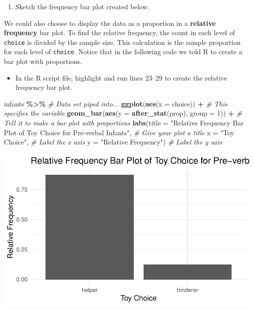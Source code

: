 \documentclass[
]{report}
\newenvironment{Shaded}{\begin{snugshade}}{\end{snugshade}}
\newcommand{\AttributeTok}[1]{\textcolor[rgb]{0.13,0.29,0.53}{#1}}
\newcommand{\CommentTok}[1]{\textcolor[rgb]{0.56,0.35,0.01}{\textit{#1}}}
\newcommand{\DecValTok}[1]{\textcolor[rgb]{0.00,0.00,0.81}{#1}}
\newcommand{\FunctionTok}[1]{\textcolor[rgb]{0.13,0.29,0.53}{\textbf{#1}}}
\newcommand{\NormalTok}[1]{#1}
\newcommand{\SpecialCharTok}[1]{\textcolor[rgb]{0.81,0.36,0.00}{\textbf{#1}}}
\newcommand{\StringTok}[1]{\textcolor[rgb]{0.31,0.60,0.02}{#1}}
\providecommand{\tightlist}{%
  \setlength{\itemsep}{0pt}\setlength{\parskip}{0pt}}
\begin{document}
\begin{enumerate}
\def\labelenumi{\arabic{enumi}.}
\setcounter{enumi}{3}
\tightlist
\item
  Sketch the frequency bar plot created below.
\end{enumerate}

\vspace{1.8in}

We could also choose to display the data as a proportion in a \textbf{relative frequency} bar plot. To find the relative frequency, the count in each level of \texttt{choice} is divided by the sample size. This calculation is the sample proportion for each level of \texttt{choice}. Notice that in the following code we told R to create a bar plot with proportions.

\begin{itemize}
\tightlist
\item
  In the R script file, highlight and run lines 23--29 to create the relative frequency bar plot.
\end{itemize}

\begin{Shaded}
\begin{Highlighting}[]
\NormalTok{infants }\SpecialCharTok{\%\textgreater{}\%} \CommentTok{\# Data set piped into...}
    \FunctionTok{ggplot}\NormalTok{(}\FunctionTok{aes}\NormalTok{(}\AttributeTok{x =}\NormalTok{ choice)) }\SpecialCharTok{+}   \CommentTok{\# This specifies the variable}
    \FunctionTok{geom\_bar}\NormalTok{(}\FunctionTok{aes}\NormalTok{(}\AttributeTok{y =} \FunctionTok{after\_stat}\NormalTok{(prop), }\AttributeTok{group =} \DecValTok{1}\NormalTok{)) }\SpecialCharTok{+}  \CommentTok{\# Tell it to make a bar plot with proportions}
    \FunctionTok{labs}\NormalTok{(}\AttributeTok{title =} \StringTok{"Relative Frequency Bar Plot of Toy Choice for Pre{-}verbal Infants"}\NormalTok{,  }
       \CommentTok{\# Give your plot a title}
       \AttributeTok{x =} \StringTok{"Toy Choice"}\NormalTok{,   }\CommentTok{\# Label the x axis}
       \AttributeTok{y =} \StringTok{"Relative Frequency"}\NormalTok{)  }\CommentTok{\# Label the y axis}
\end{Highlighting}
\end{Shaded}

\begin{center}\includegraphics[width=0.5\linewidth]{03-A06-inference-1cat_test-simulation_files/figure-latex/unnamed-chunk-4-1} \end{center}
\end{document}

